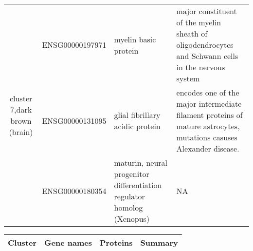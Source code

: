 \begin{table}
\begin{center}
\begin{tabular}{|c|c|p{1.9in}|p{2.5in}|}
 \hline
 \multirow{3}{4em}{cluster 7,dark brown (brain)} & ENSG00000197971 & myelin basic protein & major constituent of the myelin sheath of oligodendrocytes and Schwann cells in the nervous system\\
 					    & ENSG00000131095 & glial fibrillary acidic protein & encodes one of the major intermediate filament proteins of mature astrocytes, mutations casuses Alexander disease.\\
					    & ENSG00000180354 & maturin, neural progenitor differentiation regulator homolog (Xenopus) & NA \\
\hline	
 \end{tabular}
 \end{center}
\end{table}




\begin{table}
\newpage
\begin{center}
\begin{tabular}{|c|c|p{1.9in}|p{2.5in}|} 
\hline
Cluster & Gene names & Proteins  & Summary \\
\hline


\end{tabular}
\end{center}
\end{table}
